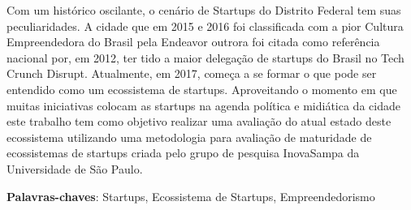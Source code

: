 \begin{resumo}

Com um histórico oscilante, o cenário de Startups do Distrito Federal tem suas peculiaridades. A cidade que em 2015 e 2016 foi classificada com a pior Cultura Empreendedora do Brasil pela Endeavor outrora foi citada como referência nacional por, em 2012, ter tido a maior delegação de startups do Brasil no Tech Crunch Disrupt. Atualmente, em 2017, começa a se formar o que pode ser entendido como um ecossistema de startups. Aproveitando o momento em que muitas iniciativas colocam as startups na agenda política e midiática da cidade este trabalho tem como objetivo realizar uma avaliação do atual estado deste ecossistema utilizando uma metodologia para avaliação de maturidade de ecossistemas de startups criada pelo grupo de pesquisa InovaSampa da Universidade de São Paulo.

 \vspace{\onelineskip}

 \noindent
 \textbf{Palavras-chaves}: Startups, Ecossistema de Startups, Empreendedorismo
\end{resumo}
